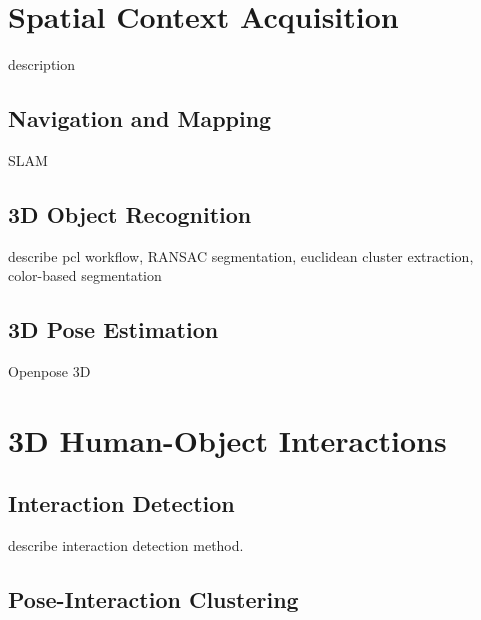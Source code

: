 \section{Spatial Context Acquisition}
description

\subsection{Navigation and Mapping}
SLAM

\subsection{3D Object Recognition}
\label{section:object_rec}
describe pcl workflow, RANSAC segmentation, euclidean cluster extraction, color-based segmentation

\subsection{3D Pose Estimation}
Openpose 3D

\section{3D Human-Object Interactions}

\subsection{Interaction Detection}
describe interaction detection method.

\subsection{Pose-Interaction Clustering}